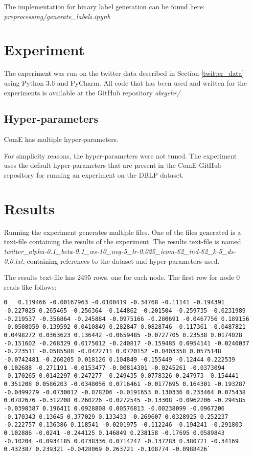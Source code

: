 \documentclass[sigconf]{acmart}
\begin{document}
The implementation for binary label generation can be found here: \textit{preprocessing/generate\_labels.ipynb}

\section{Experiment}

The experiment was run on the twitter data described in Section \ref{twitter_data} using Python 3.6 and PyCharm. All code that has been used and written for the experiments is available at the GitHub repository \textit{abegehr/}

\subsection{Hyper-parameters}

ComE has multiple hyper-parameters.

For simplicity reasons, the hyper-parameters were not tuned. The experiment uses the default hyper-parameters that are present in the ComE GitHub repository for running an experiment on the DBLP dataset\cite{ComE}.

\section{Results}

Running the experiment generates multiple files. One of the files generated is a text-file containing the results of the experiment. The results text-file is named \textit{twitter\_alpha-0.1\_beta-0.1\_ws-10\_neg-5\_lr-0.025\_icom-62\_ind-62\_k-5\_ds-0.0.txt}, containing references to the dataset and hyper-parameters used.

The results text-file has 2495 rows, one for each node. The first row for node 0 reads like follows:
\begin{lstlisting}
0	0.119466 -0.00167963 -0.0100419 -0.34768 -0.11141 -0.194391 -0.227025 0.265465 -0.256364 -0.144862 -0.201504 -0.259735 -0.0231989 -0.219537 -0.356864 -0.245884 -0.0975166 -0.280691 -0.0467756 0.189156 -0.0508059 0.139592 0.0410849 0.282847 0.0828746 -0.117361 -0.0487821 0.0498272 0.0363623 0.136442 -0.0659485 -0.0727705 0.23538 0.0174028 -0.151602 -0.268329 0.0175012 -0.240817 -0.159485 0.0954141 -0.0240037 -0.223511 -0.0585588 -0.0422711 0.0720152 -0.0403358 0.0575148 -0.0742481 -0.260205 0.018126 0.104849 -0.155449 -0.12444 0.222539 0.102688 -0.271191 -0.0153477 -0.00814301 -0.0245261 -0.0373094 -0.170265 0.0142297 0.247277 -0.249435 0.0778326 0.247973 -0.154441 0.351208 0.0586203 -0.0348056 0.0716461 -0.0177695 0.164301 -0.193287 -0.0499279 -0.0730012 -0.078206 -0.0191653 0.130336 0.233464 0.075438 0.0782676 -0.312208 0.260226 -0.0272545 -0.13308 -0.0962206 -0.294585 -0.0398387 0.196411 0.0928808 0.00576813 -0.00238099 -0.0967206 -0.170343 0.13645 0.377029 0.133433 -0.269607 0.0328925 0.252237 -0.222757 0.136386 0.118541 -0.0201975 -0.112246 -0.194241 -0.291803 0.102886 -0.0241 -0.244125 0.146849 0.238158 -0.17695 0.0589843 -0.10204 -0.0934185 0.0738336 0.0714247 -0.137283 0.380721 -0.34169 0.432387 0.239321 -0.0428069 0.263721 -0.108774 -0.0988426`
\end{lstlisting}
\end{document}
